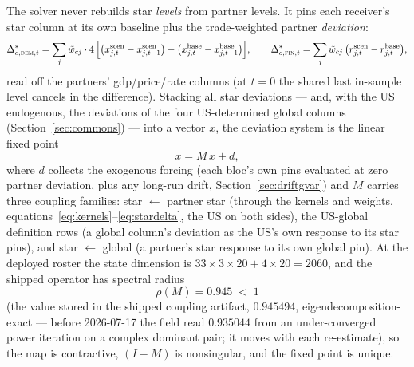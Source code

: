 \documentclass[11pt]{article}
\theoremstyle{plain}
\theoremstyle{remark}
\begin{document}
The solver never rebuilds star \emph{levels} from partner levels.
It pins each receiver's star column at its own baseline plus the
trade-weighted partner \emph{deviation}:
\begin{equation}\label{eq:stardelta}
  \Delta^{*}_{c,\textsc{dem},t}
  = \sum_{j}\tilde{w}_{cj}\cdot 4\,
    \Bigl[\bigl(x^{\text{scen}}_{j,t}-x^{\text{scen}}_{j,t-1}\bigr)
        - \bigl(x^{\text{base}}_{j,t}-x^{\text{base}}_{j,t-1}\bigr)\Bigr],
  \qquad
  \Delta^{*}_{c,\textsc{fin},t}
  = \sum_{j}\tilde{w}_{cj}\,
    \bigl(r^{\text{scen}}_{j,t}-r^{\text{base}}_{j,t}\bigr),
\end{equation}
read off the partners' gdp/price/rate columns (at $t=0$ the shared last
in-sample level cancels in the difference). Stacking all star deviations
--- and, with the US endogenous, the deviations of the four US-determined
global columns (Section~\ref{sec:commons}) --- into a vector $x$, the
deviation system is the linear fixed point
\begin{equation}\label{eq:fp}
  x = M\,x + d,
\end{equation}
where $d$ collects the exogenous forcing (each bloc's own pins evaluated
at zero partner deviation, plus any long-run drift,
Section~\ref{sec:driftgvar}) and $M$ carries three coupling families:
star $\leftarrow$ partner star (through the kernels and weights,
equations~\eqref{eq:kernels}--\eqref{eq:stardelta}, the US on both
sides), the US-global definition rows (a global column's deviation as
the US's own response to its star pins), and star $\leftarrow$ global (a
partner's star response to its own global pin). At the deployed roster
the state dimension is $33 \times 3 \times 20 + 4 \times 20 = 2060$, and
the shipped operator has spectral radius
\begin{equation}\label{eq:rho}
  \rho(M) = 0.945 \;<\; 1
\end{equation}
(the value stored in the shipped coupling artifact, $0.945494$,
eigendecomposition-exact --- before 2026-07-17 the field read $0.935044$ from an
under-converged power iteration on a complex dominant pair; it moves
with each re-estimate), so the map is contractive, $(I-M)$ is
nonsingular, and the fixed point is unique.
\end{document}
